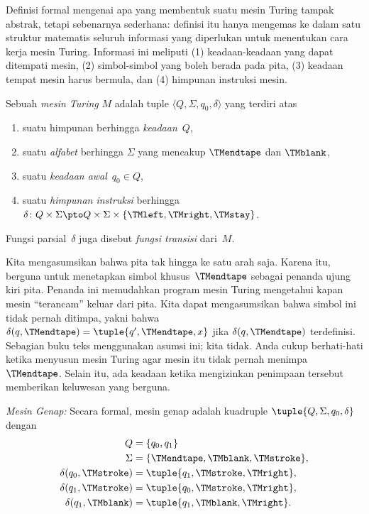\documentclass[../../../include/open-logic-section]{subfiles}
\begin{document}

\begin{explain}
Definisi formal mengenai apa yang membentuk suatu mesin Turing tampak
abstrak, tetapi sebenarnya sederhana: definisi itu hanya mengemas ke dalam satu
struktur matematis seluruh informasi yang diperlukan untuk menentukan cara
kerja mesin Turing. Informasi ini meliputi (1) keadaan-keadaan yang dapat
ditempati mesin, (2) simbol-simbol yang boleh berada pada pita, (3) keadaan
tempat mesin harus bermula, dan (4) himpunan instruksi mesin.
\end{explain}

\begin{defn}
Sebuah \emph{mesin Turing} $M$ adalah tuple $\langle Q, \Sigma, q_0,
\delta\rangle$ yang terdiri atas
\begin{enumerate}
\item suatu himpunan berhingga \emph{keadaan}~$Q$,
\item suatu \emph{alfabet} berhingga $\Sigma$ yang mencakup $\TMendtape$ dan
  $\TMblank$,
\item suatu \emph{keadaan awal}~$q_0 \in Q$,
\item suatu \emph{himpunan instruksi} berhingga~$\delta\colon Q \times \Sigma
  \pto Q \times \Sigma \times \{\TMleft, \TMright, \TMstay\}$.
\end{enumerate}
Fungsi parsial~$\delta$ juga disebut \emph{fungsi transisi} dari~$M$.
\end{defn}

\begin{explain}
Kita mengasumsikan bahwa pita tak hingga ke satu arah saja. Karena itu,
berguna untuk menetapkan simbol khusus~$\TMendtape$ sebagai penanda ujung kiri
pita. Penanda ini memudahkan program mesin Turing mengetahui kapan mesin
``terancam'' keluar dari pita. Kita dapat mengasumsikan bahwa simbol ini tidak
pernah ditimpa, yakni bahwa $\delta(q,\TMendtape) = \tuple{q', \TMendtape, x}$
jika $\delta(q,\TMendtape)$ terdefinisi. Sebagian buku teks menggunakan
asumsi ini; kita tidak. Anda cukup berhati-hati ketika menyusun mesin Turing
agar mesin itu tidak pernah menimpa~$\TMendtape$. Selain itu, ada keadaan
ketika mengizinkan penimpaan tersebut memberikan keluwesan yang berguna.
\end{explain}

\begin{ex}
\emph{Mesin Genap:} Secara formal, mesin genap adalah kuadruple
$\tuple{Q, \Sigma, q_0, \delta}$ dengan
\begin{align*}
Q & = \{ q_0, q_1 \} \\
\Sigma & = \{ \TMendtape, \TMblank, \TMstroke \}, \\
\delta(q_0, \TMstroke) & = \tuple{q_1, \TMstroke, \TMright},\\
\delta(q_1, \TMstroke) & = \tuple{q_0, \TMstroke, \TMright},\\
\delta(q_1, \TMblank)  & = \tuple{q_1, \TMblank, \TMright}.
\end{align*}
\end{ex}
\end{document}
